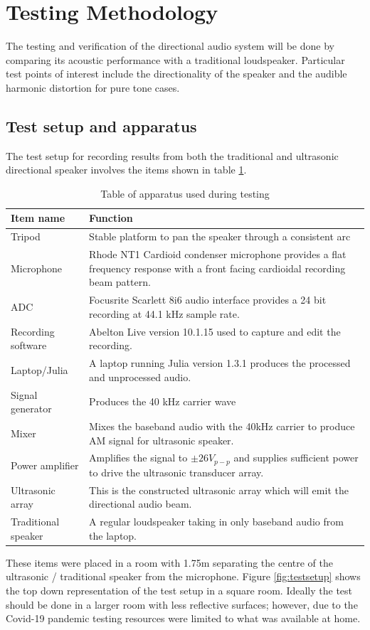 \section{Testing Methodology}
The testing and verification of the directional audio system will be done by comparing its acoustic performance with a traditional loudspeaker. Particular test points of interest include the directionality of the speaker and the audible harmonic distortion for pure tone cases.
\subsection{Test setup and apparatus}
The test setup for recording results from both the traditional and ultrasonic directional speaker involves the items shown in table \ref{tab:apparatus}.
\begin{table}[ht!]
    \centering
    \begin{tabular}{|l|p{12cm}|}
    \hline
         \textbf{Item name}& \textbf{Function} \\ \hline
        Tripod & Stable platform to pan the speaker through a consistent arc \\ \hline
        Microphone & Rhode NT1 Cardioid condenser microphone provides a flat frequency response with a front facing cardioidal recording beam pattern. \\ \hline
        ADC & Focusrite Scarlett 8i6 audio interface provides a 24 bit recording at 44.1 kHz sample rate.\\ \hline
        Recording software & Abelton Live version 10.1.15 used to capture and edit the recording. \\ \hline
        Laptop/Julia & A laptop running Julia version 1.3.1 produces the processed and unprocessed audio. \\ \hline
        Signal generator & Produces the 40 kHz carrier wave \\ \hline
        Mixer & Mixes the baseband audio with the 40kHz carrier to produce AM signal for ultrasonic speaker. \\ \hline
        Power amplifier & Amplifies the signal to $\pm 26 V_{p-p}$ and supplies sufficient power to drive the ultrasonic transducer array.\\ \hline
        Ultrasonic array & This is the constructed ultrasonic array which will emit the directional audio beam. \\ \hline
        Traditional speaker & A regular loudspeaker taking in only baseband audio from the laptop. \\ \hline
    \end{tabular}
    \caption{Table of apparatus used during testing}
    \label{tab:apparatus}
\end{table}
These items were placed in a room with 1.75m separating the centre of the ultrasonic / traditional speaker from the microphone. Figure \ref{fig:testsetup} shows the top down representation of the test setup in a square room. Ideally the test should be done in a larger room with less reflective surfaces; however, due to the Covid-19 pandemic testing resources were limited to what was available at home.

